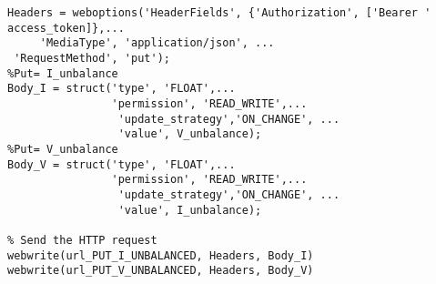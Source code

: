 \begin{lstlisting}[style=Matlab-Pyglike]
% Define the HTTP options
Headers = weboptions('HeaderFields', {'Authorization', ['Bearer ' access_token]},...
     'MediaType', 'application/json', ...
 'RequestMethod', 'put'); 
%Put= I_unbalance
Body_I = struct('type', 'FLOAT',...
                'permission', 'READ_WRITE',...
                 'update_strategy','ON_CHANGE', ...
                 'value', V_unbalance);
%Put= V_unbalance
Body_V = struct('type', 'FLOAT',...
                'permission', 'READ_WRITE',...
                 'update_strategy','ON_CHANGE', ...
                 'value', I_unbalance);

% Send the HTTP request
webwrite(url_PUT_I_UNBALANCED, Headers, Body_I)
webwrite(url_PUT_V_UNBALANCED, Headers, Body_V)
\end{lstlisting}



